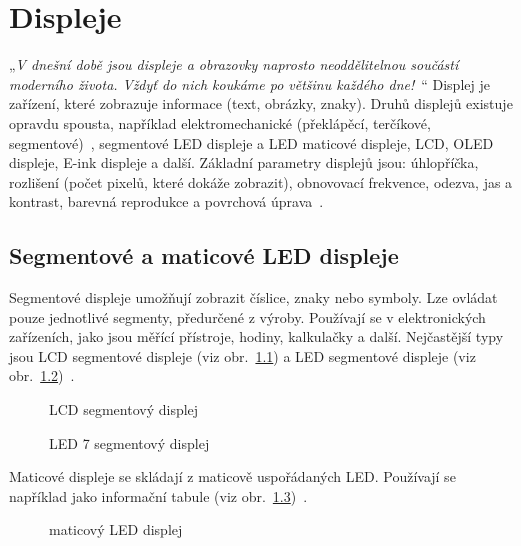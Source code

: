 \chapter{Displeje}

    „\emph{V dnešní době jsou displeje a obrazovky naprosto neoddělitelnou součástí moderního života. Vždyť do nich koukáme po většinu každého dne!}~\cite{DisplejToply}“ Displej je zařízení, které zobrazuje informace (text, obrázky, znaky). Druhů displejů existuje opravdu spousta, například elektromechanické (překlápěcí, terčíkové, segmentové)~\cite{ElektromechanickeDispleje}, segmentové LED displeje a LED maticové displeje, LCD, OLED displeje, E-ink displeje a další. Základní parametry displejů jsou: úhlopříčka, rozlišení (počet pixelů, které dokáže zobrazit), obnovovací frekvence, odezva, jas a kontrast, barevná reprodukce a povrchová úprava~\cite{DisplejToply}.

    \section{Segmentové a maticové LED displeje}
        Segmentové displeje umožňují zobrazit číslice, znaky nebo symboly. Lze ovládat pouze jednotlivé segmenty, předurčené z výroby. Používají se v elektronických zařízeních, jako jsou měřící přístroje, hodiny, kalkulačky a další. Nejčastější typy jsou LCD segmentové displeje (viz obr.~\ref{LCDseg}) a LED segmentové displeje (viz obr.~\ref{LEDseg})~\cite{ZobrazovaciJednotky}.

        \begin{figure}[htb]
        \caption{LCD segmentový displej~\cite{LCDsegDisplej}}
        \label{LCDseg}
        \end{figure}
        
        \begin{figure}[htb]
        \caption{LED 7 segmentový displej~\cite{7segmentdisplejPrincipAfunkcia}}
        \label{LEDseg}
        \end{figure}
        
        Maticové displeje se skládají z maticově uspořádaných LED. Používají se například jako informační tabule (viz obr.~\ref{LEDmat})~\cite{MaticovyLEDdisplej}.

        \begin{figure}[htb]
        \caption{maticový LED displej~\cite{MaticovyDisplej}}
        \label{LEDmat}
        \end{figure}

